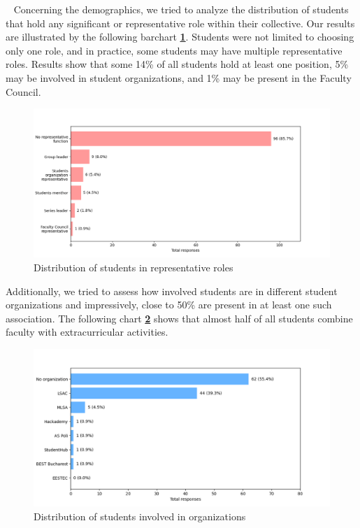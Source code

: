 ~
Concerning the demographics, we tried to analyze the distribution of students that hold any significant or representative role within their collective. Our results are illustrated by the following barchart \textbf{\ref{3:fig:students_representatives}}. Students were not limited to choosing only one role, and in practice, some students may have multiple representative roles. 
Results show that some 14\% of all students hold at least one position, 5\% may be involved in student organizations, and 1\% may be present in the Faculty Council.

\begin{figure}[ht]
    \centering
         \includegraphics[height=0.35\textheight]{figures/charts/survey/survey-students-representatives-bar.png}
    \caption{Distribution of students in representative roles}
    \label{3:fig:students_representatives}
\end{figure}

Additionally, we tried to assess how involved students are in different student organizations and impressively, close to 50\% are present in at least one such association. The following chart \textbf{\ref{3:fig:students_organizations}} shows that almost half of all students combine faculty with extracurricular activities.

\begin{figure}[ht]
    \centering
         \includegraphics[height=0.35\textheight]{figures/charts/survey/survey-student-organizations-bar.png}
    \caption{Distribution of students involved in organizations}
    \label{3:fig:students_organizations}
\end{figure}

